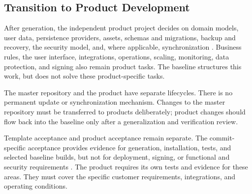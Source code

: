 \subsection{Transition to Product Development}
\label{subsec:ueberfuehrung-produktentwicklung}

After generation, the independent product project decides on domain models,
user data, persistence providers, assets, schemas and migrations, backup and
recovery, the security model, and, where applicable, synchronization
\parencite{kleiveist2026persistence}. Business rules, the user interface,
integrations, operations, scaling, monitoring, data protection, and signing
also remain product tasks. The baseline structures this work, but does not
solve these product-specific tasks.

The master repository and the product have separate lifecycles. There is no
permanent update or synchronization mechanism. Changes to the master
repository must be transferred to products deliberately; product changes
should flow back into the baseline only after a generalization and
verification review.

Template acceptance and product acceptance remain separate. The
commit-specific acceptance provides evidence for generation, installation,
tests, and selected baseline builds, but not for deployment, signing, or
functional and security requirements
\parencite{kleiveist2026acceptance}. The product requires its own tests and
evidence for these areas.
They must cover the specific customer requirements, integrations, and
operating conditions.
